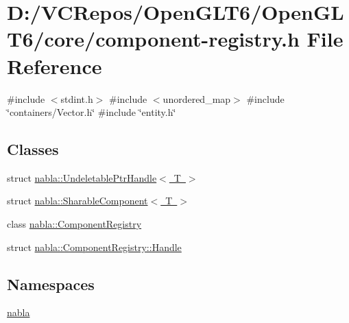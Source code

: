 \hypertarget{component-registry_8h}{}\section{D\+:/\+V\+C\+Repos/\+Open\+G\+L\+T6/\+Open\+G\+L\+T6/core/component-\/registry.h File Reference}
\label{component-registry_8h}
{\ttfamily \#include $<$stdint.\+h$>$}\newline
{\ttfamily \#include $<$unordered\+\_\+map$>$}\newline
{\ttfamily \#include \char`\"{}containers/\+Vector.\+h\char`\"{}}\newline
{\ttfamily \#include \char`\"{}entity.\+h\char`\"{}}\newline
\subsection*{Classes}
\begin{DoxyCompactItemize}
\item 
struct \mbox{\hyperlink{structnabla_1_1_undeletable_ptr_handle}{nabla\+::\+Undeletable\+Ptr\+Handle$<$ T $>$}}
\item 
struct \mbox{\hyperlink{structnabla_1_1_sharable_component}{nabla\+::\+Sharable\+Component$<$ T $>$}}
\item 
class \mbox{\hyperlink{classnabla_1_1_component_registry}{nabla\+::\+Component\+Registry}}
\item 
struct \mbox{\hyperlink{structnabla_1_1_component_registry_1_1_handle}{nabla\+::\+Component\+Registry\+::\+Handle}}
\end{DoxyCompactItemize}
\subsection*{Namespaces}
\begin{DoxyCompactItemize}
\item 
 \mbox{\hyperlink{namespacenabla}{nabla}}
\end{DoxyCompactItemize}
